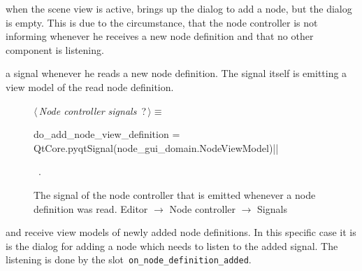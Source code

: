 \documentclass[%
    a4paper,    %
    justified,  %
    nobib,      %
    openany     %
]{tufte-book}
\makeatletter
\renewcommand{\label}[1]{\@tufte@label{##1}}%
\makeatother
\begin{document}
 when the scene view is active, brings up
the dialog to add a node, but the dialog is empty. This is due to the
circumstance, that the node controller is not informing whenever he receives a
new node definition and that no other component is listening.

 a signal whenever he reads a
new node definition. The signal itself is emitting a view model of the read node
definition.

\begin{figure}
\begin{flushleft} \small
\begin{minipage}{\linewidth}\label{scrap152}\raggedright\small
{} $\langle\,${\itshape Node controller signals}\nobreak\ {\footnotesize {?}}$\,\rangle\equiv$
\vspace{-1ex}
\begin{pythoncode}
do_add_node_view_definition = QtCore.pyqtSignal(node_gui_domain.NodeViewModel)|\NWsep|
\end{pythoncode}
\vspace{1.5ex}
\footnotesize
\begin{list}{}{\setlength{\itemsep}{-\parsep}\setlength{\itemindent}{-\leftmargin}}
\item \NWtxtMacroRefIn\ .

\item{}
\end{list}
\end{minipage}\vspace{4ex}
\end{flushleft}
\caption{The signal of the node controller that is emitted whenever a node
  definition was read.
  \newline{}\newline{}Editor $\rightarrow$ Node controller $\rightarrow$ Signals}
\label{editor:lst:node-controller:signals:do-add-node-view-definition}
\end{figure}

 and receive view models of newly
added node definitions. In this specific case it is is the dialog for adding a
node which needs to listen to the added signal. The listening is done by the
slot~\verb=on_node_definition_added=.
\end{document}
